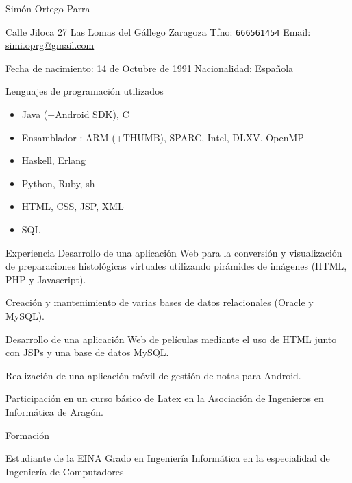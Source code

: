 {\LARGE Simón Ortego Parra}

Calle Jiloca 27 \singlelinebreak
Las Lomas del Gállego  Zaragoza 
Tfno: \texttt{666\vspace{0.25em}561\vspace{0.25em}454}
Email: \href{mailto:simi.oprg@gmail.com}{simi.oprg@gmail.com}\\

\vfill

Fecha de nacimiento: 14 de Octubre de 1991
Nacionalidad: Española

\vfill

{\Large Lenguajes de programación utilizados}

\begin{itemize}*
\item Java (+Android SDK), C
\item Ensamblador : ARM (+THUMB), SPARC, Intel, DLXV. OpenMP
\item Haskell, Erlang
\item Python, Ruby, sh
\item HTML, CSS, JSP, XML
\item SQL
\end{itemize}

{\Large Experiencia}
 Desarrollo de una aplicación Web para la conversión y 
visualización de preparaciones histológicas virtuales utilizando pirámides 
de imágenes (HTML, PHP y Javascript).

 Creación y mantenimiento de varias bases de datos
relacionales (Oracle y MySQL).
	
 Desarrollo de una aplicación Web de películas mediante el uso
de HTML junto con JSPs y una base de datos MySQL.
	
 Realización de una aplicación móvil de gestión de notas para Android.

 Participación en un curso básico de Latex en la Asociación de Ingenieros 
en Informática de Aragón.
	

{\Large Formación}

 Estudiante de la EINA \singlelinebreak
Grado en Ingeniería Informática en la especialidad de Ingeniería de Computadores

